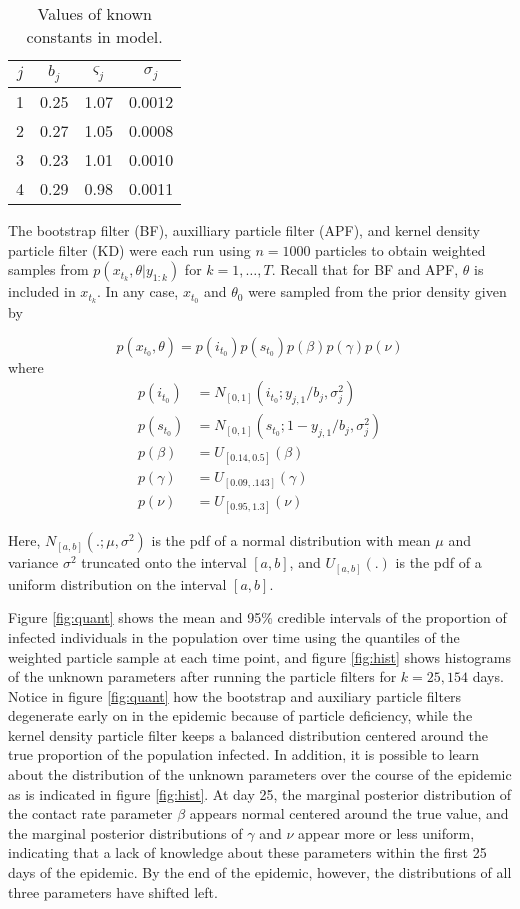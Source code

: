 \documentclass{article}
\begin{document}
\begin{table}[ht]
\begin{center}
\caption{Values of known constants in model.} \label{tab:true}
\begin{tabular}{|cccc|}
\hline
$j$ & $b_j$ & $\varsigma_j$ & $\sigma_j$ \\
\hline
1 & 0.25 & 1.07 & 0.0012 \\
2 & 0.27 & 1.05 & 0.0008 \\
3 & 0.23 & 1.01 & 0.0010 \\
4 & 0.29 & 0.98 & 0.0011 \\
\hline
\end{tabular}
\end{center}
\end{table}

The bootstrap filter (BF), auxilliary particle filter (APF), and kernel density particle filter (KD) were each run using $n = 1000$ particles to obtain weighted samples from $p(x_{t_k},\theta|y_{1:k})$ for $k = 1,\ldots,T$.  Recall that for BF and APF, $\theta$ is included in $x_{t_k}$.  In any case, $x_{t_0}$ and $\theta_{0}$ were sampled from the prior density given by

\[p(x_{t_0},\theta) = p(i_{t_0})p(s_{t_0})p(\beta)p(\gamma)p(\nu)\] where
\begin{align*}
p(i_{t_0}) &= N_{[0,1]}(i_{t_0};y_{j,1}/b_j,\sigma^2_j) \\
p(s_{t_0}) &= N_{[0,1]}(s_{t_0};1 - y_{j,1}/b_j,\sigma^2_j) \\
p(\beta) &= U_{[0.14,0.5]}(\beta) \\
p(\gamma) &= U_{[0.09,.143]}(\gamma) \\
p(\nu) &= U_{[0.95,1.3]}(\nu)
\end{align*}

\noindent Here, $N_{[a,b]}(.;\mu,\sigma^2)$ is the pdf of a normal distribution with mean $\mu$ and variance $\sigma^2$ truncated onto the interval $[a,b]$, and $U_{[a,b]}(.)$ is the pdf of a uniform distribution on the interval $[a,b]$.

Figure \ref{fig:quant} shows the mean and 95\% credible intervals of the proportion of infected individuals in the population over time using the quantiles of the weighted particle sample at each time point, and figure \ref{fig:hist} shows histograms of the unknown parameters after running the particle filters for $k = 25, 154$ days.  Notice in figure \ref{fig:quant} how the bootstrap and auxiliary particle filters degenerate early on in the epidemic because of particle deficiency, while the kernel density particle filter keeps a balanced distribution centered around the true proportion of the population infected.  In addition, it is possible to learn about the distribution of the unknown parameters over the course of the epidemic as is indicated in figure \ref{fig:hist}.  At day 25, the marginal posterior distribution of the contact rate parameter $\beta$ appears normal centered around the true value, and the marginal posterior distributions of $\gamma$ and $\nu$ appear more or less uniform, indicating that a lack of knowledge about these parameters within the first 25 days of the epidemic.  By the end of the epidemic, however, the distributions of all three parameters have shifted left.
\end{document}
